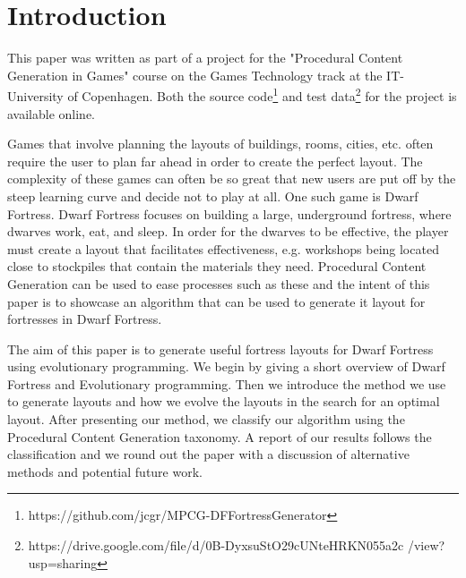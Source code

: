 \section{Introduction}
\label{01}
This paper was written as part of a project for the "Procedural Content Generation in Games" course on the Games Technology track at the IT-University of Copenhagen. Both the source code\footnote{https://github.com/jcgr/MPCG-DFFortressGenerator} and test data\footnote{https://drive.google.com/file/d/0B-DyxsuStO29cUNteHRKN055a2c /view?usp=sharing} for the project is available online.

Games that involve planning the layouts of buildings, rooms, cities, etc. often require the user to plan far ahead in order to create the perfect layout. The complexity of these games can often be so great that new users are put off by the steep learning curve and decide not to play at all. One such game is Dwarf Fortress\cite{DwarfFortress}. Dwarf Fortress focuses on building a large, underground fortress, where dwarves work, eat, and sleep. In order for the dwarves to be effective, the player must create a layout that facilitates effectiveness, e.g. workshops being located close to stockpiles that contain the materials they need. Procedural Content Generation can be used to ease processes such as these and the intent of this paper is to showcase an algorithm that can be used to generate it layout for fortresses in Dwarf Fortress.

The aim of this paper is to generate useful fortress layouts for Dwarf Fortress using evolutionary programming. We begin by giving a short overview of Dwarf Fortress and Evolutionary programming. Then we introduce the method we use to generate layouts and how we evolve the layouts in the search for an optimal layout. After presenting our method, we classify our algorithm using the Procedural Content Generation taxonomy\cite{togelius2010search}. A report of our results follows the classification and we round out the paper with a discussion of alternative methods and potential future work.